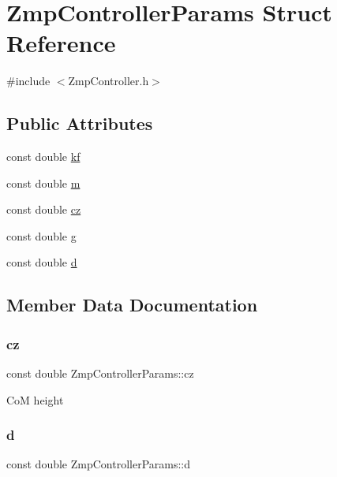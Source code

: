\hypertarget{structZmpControllerParams}{}\section{Zmp\+Controller\+Params Struct Reference}
\label{structZmpControllerParams}


{\ttfamily \#include $<$Zmp\+Controller.\+h$>$}

\subsection*{Public Attributes}
\begin{DoxyCompactItemize}
\item 
const double \hyperlink{structZmpControllerParams_a6138cbf819799519abd3864bd8bf05cf}{kf}
\item 
const double \hyperlink{structZmpControllerParams_a1a3eea24e276953f2e74c4066b24106c}{m}
\item 
const double \hyperlink{structZmpControllerParams_ae0d24b7bdae3eb228b9db827934d0e87}{cz}
\item 
const double \hyperlink{structZmpControllerParams_af97a6bcc6b60e8372dd444d695d705f7}{g}
\item 
const double \hyperlink{structZmpControllerParams_a00f5d68e5a1215bbe7b722375d95d243}{d}
\end{DoxyCompactItemize}


\subsection{Member Data Documentation}
\hypertarget{structZmpControllerParams_ae0d24b7bdae3eb228b9db827934d0e87}{}\label{structZmpControllerParams_ae0d24b7bdae3eb228b9db827934d0e87} 
\subsubsection{\texorpdfstring{cz}{cz}}
{\footnotesize\ttfamily const double Zmp\+Controller\+Params\+::cz}

CoM height \hypertarget{structZmpControllerParams_a00f5d68e5a1215bbe7b722375d95d243}{}\label{structZmpControllerParams_a00f5d68e5a1215bbe7b722375d95d243} 
\subsubsection{\texorpdfstring{d}{d}}
{\footnotesize\ttfamily const double Zmp\+Controller\+Params\+::d}

